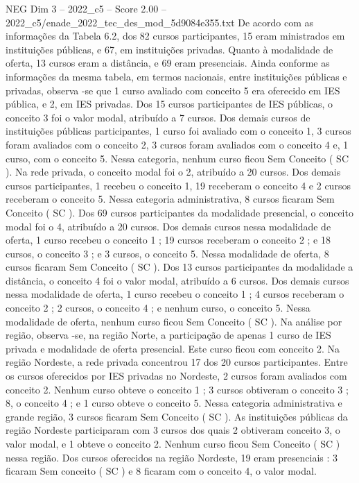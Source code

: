 \begin{textsample}{NEG Dim 3 – 2022\_c5 – Score 2.00 – 2022\_c5/enade\_2022\_tec\_des\_mod\_5d9084e355.txt}
De acordo com as informações da Tabela 6.2, dos 82 cursos participantes, 15 eram ministrados em instituições públicas, e 67, em instituições privadas.
Quanto à modalidade de oferta, 13 cursos eram a distância, e 69 eram presenciais.
Ainda conforme as informações da mesma tabela, em termos nacionais, entre instituições públicas e privadas, observa -se que 1 curso avaliado com conceito 5 era oferecido em IES pública, e 2, em IES privadas.
Dos 15 cursos participantes de IES públicas, o conceito 3 foi o valor modal, atribuído a 7 cursos.
Dos demais cursos de instituições públicas participantes, 1 curso foi avaliado com o conceito 1, 3 cursos foram avaliados com o conceito 2, 3 cursos foram avaliados com o conceito 4 e, 1 curso, com o conceito 5.
Nessa categoria, nenhum curso ficou Sem Conceito ( SC ).
Na rede privada, o conceito modal foi o 2, atribuído a 20 cursos.
Dos demais cursos participantes, 1 recebeu o conceito 1, 19 receberam o conceito 4 e 2 cursos receberam o conceito 5.
Nessa categoria administrativa, 8 cursos ficaram Sem Conceito ( SC ).
Dos 69 cursos participantes da modalidade presencial, o conceito modal foi o 4, atribuído a 20 cursos.
Dos demais cursos nessa modalidade de oferta, 1 curso recebeu o conceito 1 ; 19 cursos receberam o conceito 2 ; e 18 cursos, o conceito 3 ; e 3 cursos, o conceito 5.
Nessa modalidade de oferta, 8 cursos ficaram Sem Conceito ( SC ).
Dos 13 cursos participantes da modalidade a distância, o conceito 4 foi o valor modal, atribuído a 6 cursos.
Dos demais cursos nessa modalidade de oferta, 1 curso recebeu o conceito 1 ; 4 cursos receberam o conceito 2 ; 2 cursos, o conceito 4 ; e nenhum curso, o conceito 5.
Nessa modalidade de oferta, nenhum curso ficou Sem Conceito ( SC ).
Na análise por região, observa -se, na região Norte, a participação de apenas 1 curso de IES privada e modalidade de oferta presencial.
Este curso ficou com conceito 2.
Na região Nordeste, a rede privada concentrou 17 dos 20 cursos participantes.
Entre os cursos oferecidos por IES privadas no Nordeste, 2 cursos foram avaliados com conceito 2.
Nenhum curso obteve o conceito 1 ; 3 cursos obtiveram o conceito 3 ; 8, o conceito 4 ; e 1 curso obteve o conceito 5.
Nessa categoria administrativa e grande região, 3 cursos ficaram Sem Conceito ( SC ).
As instituições públicas da região Nordeste participaram com 3 cursos dos quais 2 obtiveram conceito 3, o valor modal, e 1 obteve o conceito 2.
Nenhum curso ficou Sem Conceito ( SC ) nessa região.
Dos cursos oferecidos na região Nordeste, 19 eram presenciais : 3 ficaram Sem conceito ( SC ) e 8 ficaram com o conceito 4, o valor modal.

\end{textsample}
